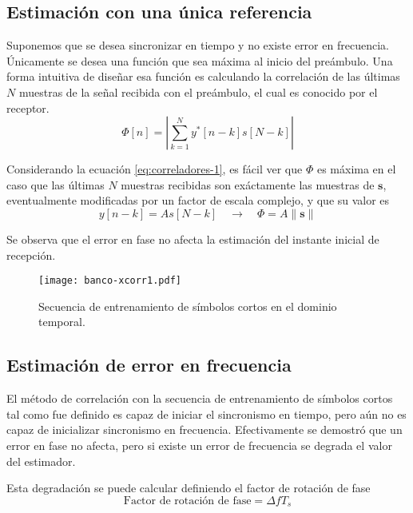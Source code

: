 \subsection{Estimación con una única referencia}

Suponemos que se desea sincronizar en tiempo y no existe error en frecuencia. Únicamente se desea una función que sea máxima al inicio del preámbulo. Una forma intuitiva de diseñar esa función es calculando la correlación de las últimas $N$ muestras de la señal recibida con el preámbulo, el cual es conocido por el receptor.
\begin{equation}\label{eq:correladores-1}
    \Phi[n] = \left\lvert \sum_{k=1}^{N}y^\ast[n-k]s[N-k] \right\rvert
\end{equation}

Considerando la ecuación \ref{eq:correladores-1}, es fácil ver que $\Phi$ es máxima en el caso que las últimas $N$ muestras recibidas son exáctamente las muestras de $\mathbf{s}$, eventualmente modificadas por un factor de escala complejo, y que su valor es\\
\begin{equation}\label{eq:correladores-2}
    y[n-k] = As[N-k] \quad \rightarrow \quad \Phi = A \lVert \mathbf{s} \rVert
\end{equation}

Se observa que el error en fase no afecta la estimación del instante inicial de recepción.

\begin{figure}[ht]
    \centering{}\texttt{[image: banco-xcorr1.pdf]}
    \caption{Secuencia de entrenamiento de símbolos cortos en el dominio temporal.\label{fig:banco-xcorr1}}  
\end{figure}


\subsection{Estimación de error en frecuencia}
\label{Ss:ch3-banco-frecuencias}
El método de correlación con la secuencia de entrenamiento de símbolos cortos tal como fue definido es capaz de iniciar el sincronismo en tiempo, pero aún no es capaz de inicializar sincronismo en frecuencia. Efectivamente se demostró que un error en fase no afecta, pero si existe un error de frecuencia se degrada el valor del estimador. 

Esta degradación se puede calcular definiendo el factor de rotación de fase
\begin{equation}
    \text{Factor de rotación de fase} = \Delta f T_s
\end{equation}

